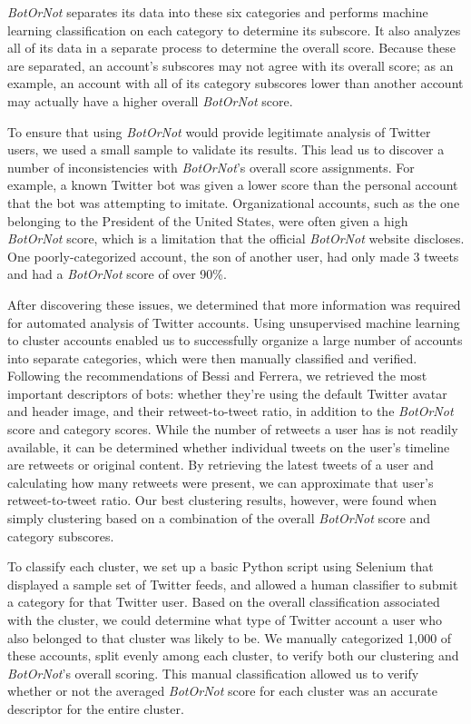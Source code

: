 \documentclass{sig-alternate-05-2015}
\begin{document}
\emph{BotOrNot} separates its data into these six categories and performs machine learning classification on each category to determine its subscore. It also analyzes all of its data in a separate process to determine the overall score. Because these are separated, an account's subscores may not agree with its overall score; as an example, an account with all of its category subscores lower than another account may actually have a higher overall \emph{BotOrNot} score.

To ensure that using \emph{BotOrNot} would provide legitimate analysis of Twitter users, we used a small sample to validate its results. This lead us to discover a number of inconsistencies with \emph{BotOrNot}'s overall score assignments. For example, a known Twitter bot was given a lower score than the personal account that the bot was attempting to imitate. Organizational accounts, such as the one belonging to the President of the United States, were often given a high \emph{BotOrNot} score, which is a limitation that the official \emph{BotOrNot} website discloses. One poorly-categorized account, the son of another user, had only made 3 tweets and had a \emph{BotOrNot} score of over 90\%.

After discovering these issues, we determined that more information was required for automated analysis of Twitter accounts. Using unsupervised machine learning to cluster accounts enabled us to successfully organize a large number of accounts into separate categories, which were then manually classified and verified. Following the recommendations of Bessi and Ferrera\cite{Bessi:PresElect}, we retrieved the most important descriptors of bots: whether they're using the default Twitter avatar and header image, and their retweet-to-tweet ratio, in addition to the \emph{BotOrNot} score and category scores. While the number of retweets a user has is not readily available, it can be determined whether individual tweets on the user's timeline are retweets or original content. By retrieving the latest tweets of a user and calculating how many retweets were present, we can approximate that user's retweet-to-tweet ratio. Our best clustering results, however, were found when simply clustering based on a combination of the overall \emph{BotOrNot} score and category subscores.

To classify each cluster, we set up a basic Python script using Selenium that displayed a sample set of Twitter feeds, and allowed a human classifier to submit a category for that Twitter user. Based on the overall classification associated with the cluster, we could determine what type of Twitter account a user who also belonged to that cluster was likely to be. We manually categorized 1,000 of these accounts, split evenly among each cluster, to verify both our clustering and \emph{BotOrNot}'s overall scoring. This manual classification allowed us to verify whether or not the averaged \emph{BotOrNot} score for each cluster was an accurate descriptor for the entire cluster.
\end{document}
